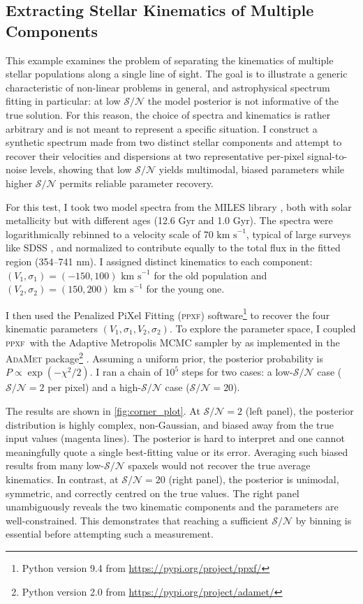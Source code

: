 \documentclass[fleqn,usenatbib]{mnras}
\newcommand{\kms}{\text{km s}^{-1}}
\newcommand{\ppxf}{\textsc{ppxf}}
\newcommand{\sn}{\mathcal{S/N}}
\begin{document}
\subsection{Extracting Stellar Kinematics of Multiple Components}

This example examines the problem of separating the kinematics of multiple stellar populations along a single line of sight. The goal is to illustrate a generic characteristic of non-linear problems in general, and astrophysical spectrum fitting in particular: at low $\sn$ the model posterior is not informative of the true solution. For this reason, the choice of spectra and kinematics is rather arbitrary and is not meant to represent a specific situation. I construct a synthetic spectrum made from two distinct stellar components and attempt to recover their velocities and dispersions at two representative per-pixel signal-to-noise levels, showing that low $\sn$ yields multimodal, biased parameters while higher $\sn$ permits reliable parameter recovery.

For this test, I took two model spectra from the MILES library \citep{Vazdekis2010}, both with solar metallicity but with different ages (12.6 Gyr and 1.0 Gyr). The spectra were logarithmically rebinned to a velocity scale of 70 $\kms$, typical of large surveys like SDSS \citep[e.g.][]{Abdurrouf2022}, and normalized to contribute equally to the total flux in the fitted region (354--741 nm). I assigned distinct kinematics to each component: $(V_1, \sigma_1) = (-150, 100)$ $\kms$ for the old population and $(V_2, \sigma_2) = (150, 200)$ $\kms$ for the young one.

I then used the Penalized PiXel Fitting (\ppxf) software\footnote{\label{note:software}Python version 9.4 from \url{https://pypi.org/project/ppxf/}} \citep{Cappellari2004,Cappellari2017,Cappellari2023} to recover the four kinematic parameters $(V_1, \sigma_1, V_2, \sigma_2)$. To explore the parameter space, I coupled \ppxf\ with the Adaptive Metropolis MCMC sampler by \citep{Haario2001} as implemented in the \textsc{AdaMet} package\footnote{Python version 2.0 from \url{https://pypi.org/project/adamet/}} \citep{Cappellari2013p15}. Assuming a uniform prior, the posterior probability is $P\propto\exp(-\chi^2/2)$. I ran a chain of $10^5$ steps for two cases: a low-$\sn$ case ($\sn=2$ per pixel) and a high-$\sn$ case ($\sn=20$).  

The results are shown in \autoref{fig:corner_plot}. At $\sn=2$ (left panel), the posterior distribution is highly complex, non-Gaussian, and biased away from the true input values (magenta lines). The posterior is hard to interpret and one cannot meaningfully quote a single best-fitting value or its error. Averaging such biased results from many low-$\sn$ spaxels would not recover the true average kinematics. In contrast, at $\sn=20$ (right panel), the posterior is unimodal, symmetric, and correctly centred on the true values. The right panel unambiguously reveals the two kinematic components and the parameters are well-constrained. This demonstrates that reaching a sufficient $\sn$ by binning is essential before attempting such a measurement.
\end{document}
